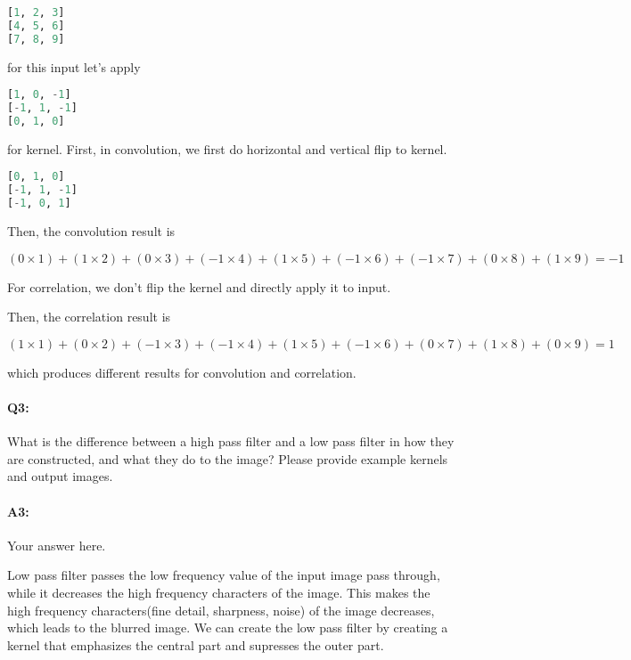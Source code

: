 \begin{lstlisting}[language={python}]
[1, 2, 3]
[4, 5, 6]
[7, 8, 9]
\end{lstlisting}

for this input let's apply 
\begin{lstlisting}[language={python}]
[1, 0, -1]
[-1, 1, -1]
[0, 1, 0]
\end{lstlisting}

for kernel. First, in convolution, we first do horizontal and vertical flip to kernel.
\begin{lstlisting}[language={python}]
[0, 1, 0]
[-1, 1, -1]
[-1, 0, 1]
\end{lstlisting}

Then, the convolution result is 

$(0\times 1) + (1\times2) + (0\times3) + (-1\times4) + (1\times5) + (-1\times6) + (-1\times7) + (0\times8) + (1\times9) = -1$

For correlation, we don't flip the kernel and directly apply it to input.

Then, the correlation result is

$(1\times 1) + (0\times2) + (-1\times3) + (-1\times4) + (1\times5) + (-1\times6) + (0\times7) + (1\times8) + (0\times9) = 1$

which produces different results for convolution and correlation.


	
	
	\pagebreak
		\paragraph{Q3:} What is the difference between a high pass filter and a low pass filter in how they are constructed, and what they do to the image? Please provide example kernels and output images.
	
	\paragraph{A3:} Your answer here.
	
	Low pass filter passes the low frequency value of the input image pass through, while it decreases the high frequency characters of the image.
	This makes the high frequency characters(fine detail, sharpness, noise) of the image decreases, which leads to the blurred image.
	We can create the low pass filter by creating a kernel that emphasizes the central part and supresses the outer part.


